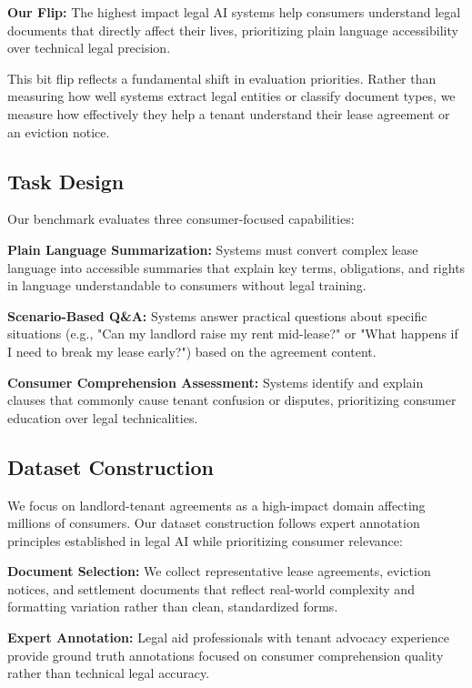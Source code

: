 \documentclass{article}
\begin{document}
\textbf{Our Flip:} The highest impact legal AI systems help consumers understand legal documents that directly affect their lives, prioritizing plain language accessibility over technical legal precision.

This bit flip reflects a fundamental shift in evaluation priorities. Rather than measuring how well systems extract legal entities or classify document types, we measure how effectively they help a tenant understand their lease agreement or an eviction notice.

\subsection{Task Design}

Our benchmark evaluates three consumer-focused capabilities:

\textbf{Plain Language Summarization:} Systems must convert complex lease language into accessible summaries that explain key terms, obligations, and rights in language understandable to consumers without legal training.

\textbf{Scenario-Based Q\&A:} Systems answer practical questions about specific situations (e.g., "Can my landlord raise my rent mid-lease?" or "What happens if I need to break my lease early?") based on the agreement content.

\textbf{Consumer Comprehension Assessment:} Systems identify and explain clauses that commonly cause tenant confusion or disputes, prioritizing consumer education over legal technicalities.

\subsection{Dataset Construction}

We focus on landlord-tenant agreements as a high-impact domain affecting millions of consumers. Our dataset construction follows expert annotation principles established in legal AI while prioritizing consumer relevance:

\textbf{Document Selection:} We collect representative lease agreements, eviction notices, and settlement documents that reflect real-world complexity and formatting variation rather than clean, standardized forms.

\textbf{Expert Annotation:} Legal aid professionals with tenant advocacy experience provide ground truth annotations focused on consumer comprehension quality rather than technical legal accuracy.
\end{document}
